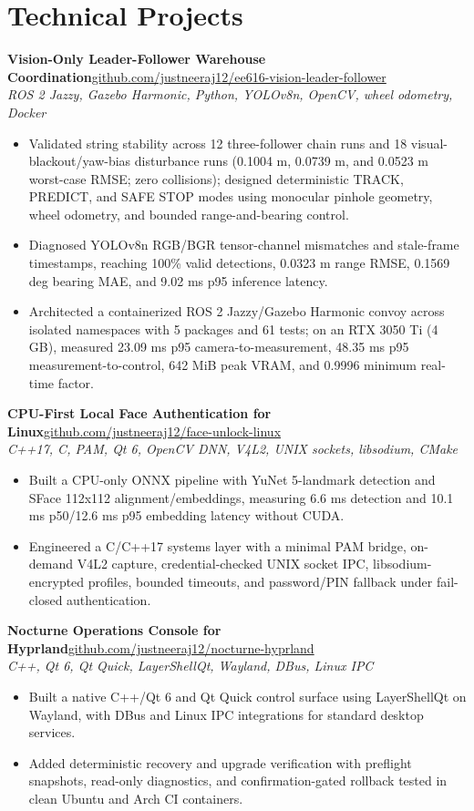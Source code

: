 \documentclass[10pt,letterpaper]{article}
\newcommand{\entry}[2]{\textbf{#1}\hfill #2\\[-1pt]}
\begin{document}
\section{Technical Projects}
\entry{Vision-Only Leader-Follower Warehouse Coordination}{\small\href{https://github.com/justneeraj12/ee616-vision-leader-follower}{github.com/justneeraj12/ee616-vision-leader-follower}}
{\small\textit{ROS 2 Jazzy, Gazebo Harmonic, Python, YOLOv8n, OpenCV, wheel odometry, Docker}}
\begin{itemize}
  \item {\small Validated string stability across 12 three-follower chain runs and 18 visual-blackout/yaw-bias disturbance runs (0.1004 m, 0.0739 m, and 0.0523 m worst-case RMSE; zero collisions); designed deterministic TRACK, PREDICT, and SAFE STOP modes using monocular pinhole geometry, wheel odometry, and bounded range-and-bearing control.}
  \item {\small Diagnosed YOLOv8n RGB/BGR tensor-channel mismatches and stale-frame timestamps, reaching 100\% valid detections, 0.0323 m range RMSE, 0.1569 deg bearing MAE, and 9.02 ms p95 inference latency.}
  \item {\small Architected a containerized ROS 2 Jazzy/Gazebo Harmonic convoy across isolated namespaces with 5 packages and 61 tests; on an RTX 3050 Ti (4 GB), measured 23.09 ms p95 camera-to-measurement, 48.35 ms p95 measurement-to-control, 642 MiB peak VRAM, and 0.9996 minimum real-time factor.}
\end{itemize}
\entry{CPU-First Local Face Authentication for Linux}{\small\href{https://github.com/justneeraj12/face-unlock-linux}{github.com/justneeraj12/face-unlock-linux}}
{\small\textit{C++17, C, PAM, Qt 6, OpenCV DNN, V4L2, UNIX sockets, libsodium, CMake}}
\begin{itemize}
  \item {\small Built a CPU-only ONNX pipeline with YuNet 5-landmark detection and SFace 112x112 alignment/embeddings, measuring 6.6 ms detection and 10.1 ms p50/12.6 ms p95 embedding latency without CUDA.}
  \item {\small Engineered a C/C++17 systems layer with a minimal PAM bridge, on-demand V4L2 capture, credential-checked UNIX socket IPC, libsodium-encrypted profiles, bounded timeouts, and password/PIN fallback under fail-closed authentication.}
\end{itemize}
\entry{Nocturne Operations Console for Hyprland}{\small\href{https://github.com/justneeraj12/nocturne-hyprland}{github.com/justneeraj12/nocturne-hyprland}}
{\small\textit{C++, Qt 6, Qt Quick, LayerShellQt, Wayland, DBus, Linux IPC}}
\begin{itemize}
  \item {\small Built a native C++/Qt 6 and Qt Quick control surface using LayerShellQt on Wayland, with DBus and Linux IPC integrations for standard desktop services.}
  \item {\small Added deterministic recovery and upgrade verification with preflight snapshots, read-only diagnostics, and confirmation-gated rollback tested in clean Ubuntu and Arch CI containers.}
\end{itemize}
\end{document}

